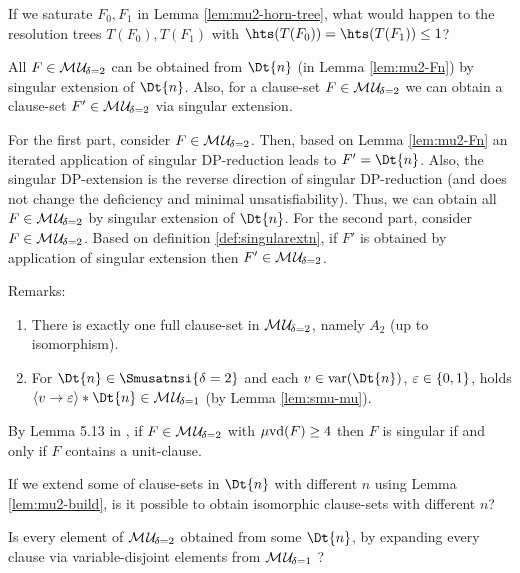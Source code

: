 \documentclass{report}
\begin{document}
\begin{quest}\label{que:mu-2-horn}
If we saturate $F_0, F_1$ in Lemma \ref{lem:mu2-horn-tree}, what would happen to the resolution trees $T(F_0), T(F_1)$ with $\hts(T(F_0))= \hts(T(F_1)) \le 1$?
\end{quest}

\begin{lem}\label{lem:mu2-build}
All $F \in \mathcal{M\hspace{0.8pt}U}_{\!\delta=2}$ can be obtained from $\Dt{n}$ (in Lemma \ref{lem:mu2-Fn}) by singular extension of  $\Dt{n}$. Also, for a clause-set $F \in \mathcal{M\hspace{0.8pt}U}_{\!\delta=2}$ we can obtain a clause-set $F' \in \mathcal{M\hspace{0.8pt}U}_{\!\delta=2}$ via singular extension.
\end{lem}
\begin{prf}
For the first part, consider $F \in \mathcal{M\hspace{0.8pt}U}_{\!\delta=2}$. Then, based on Lemma \ref{lem:mu2-Fn} an iterated application of singular DP-reduction leads to $F'=\Dt{n}$. Also, the singular DP-extension is the reverse direction of singular DP-reduction (and does not change the deficiency and minimal unsatisfiability). Thus, we can obtain all $F \in \mathcal{M\hspace{0.8pt}U}_{\!\delta=2}$ by singular extension of $\Dt{n}$. For the second part, consider $F \in \mathcal{M\hspace{0.8pt}U}_{\!\delta=2}$. Based on definition \ref{def:singularextn}, if $F'$ is obtained by application of singular extension then $F' \in \mathcal{M\hspace{0.8pt}U}_{\!\delta=2}$.
\end{prf}
Remarks:
  \begin{enumerate}
  \item There is exactly one full clause-set in $\mathcal{M\hspace{0.8pt}U}_{\!\delta=2}$, namely $A_2$ (up to isomorphism).
  \item For $\Dt{n} \in \Smusatnsi{\delta=2}$ and each $v \in \var(\Dt{n})$, $\varepsilon \in \{ 0,1 \}$, holds $\pao v{\ve} * \Dt{n} \in \Musati{\delta=1}$ (by Lemma \ref{lem:smu-mu}).
  \end{enumerate}
  
\begin{lem}\label{lem:mu2-sing}
 By Lemma 5.13 in \cite{KullmannZhao2010Extremal}, if $F \in \mathcal{M\hspace{0.8pt}U}_{\!\delta=2}$ with $\operatorname{\mu\!\operatorname{vd}}(F) \ge 4$ then $F$ is singular if and only if $F$ contains a unit-clause.
\end{lem}  

\begin{quest}\label{que:mu-2-ism}
If we extend some of clause-sets in $\Dt{n}$ with different $n$ using Lemma \ref{lem:mu2-build}, is it possible to obtain isomorphic clause-sets with different $n$?
\end{quest}

\begin{quest}\label{que:mu2-from-mu1}
Is every element of $\mathcal{M\hspace{0.8pt}U}_{\!\delta=2}$ obtained from some $\Dt{n}$, by expanding every clause via variable-disjoint elements from $\mathcal{M\hspace{0.8pt}U}_{\!\delta=1}$ ?
\end{quest}
\end{document}
